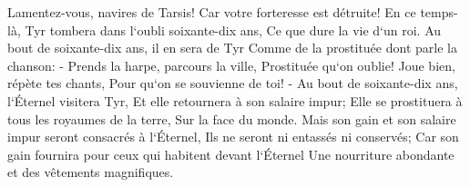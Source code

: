 \verse Lamentez-vous, navires de Tarsis! Car votre forteresse est détruite! 
\verse En ce temps-là, Tyr tombera dans l`oubli soixante-dix ans, Ce que dure la vie d`un roi. Au bout de soixante-dix ans, il en sera de Tyr Comme de la prostituée dont parle la chanson: - 
\verse Prends la harpe, parcours la ville, Prostituée qu`on oublie! Joue bien, répète tes chants, Pour qu`on se souvienne de toi! - 
\verse Au bout de soixante-dix ans, l`Éternel visitera Tyr, Et elle retournera à son salaire impur; Elle se prostituera à tous les royaumes de la terre, Sur la face du monde. 
\verse Mais son gain et son salaire impur seront consacrés à l`Éternel, Ils ne seront ni entassés ni conservés; Car son gain fournira pour ceux qui habitent devant l`Éternel Une nourriture abondante et des vêtements magnifiques. 

